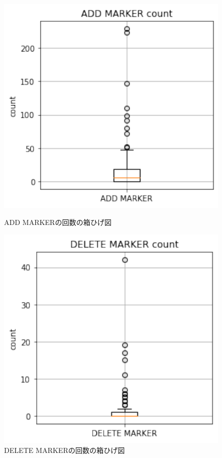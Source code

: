 \documentclass[a4paper,12pt]{ltjsreport}
\begin{document}
\begin{figure}[tbp]
  \begin{minipage}[b]{0.5\linewidth}
    \centering
    \includegraphics[scale=0.7]{add_marker.pdf}
    \caption{ADD MARKERの回数の箱ひげ図}
    \label{fig:add_marker}
  \end{minipage}
  \begin{minipage}[b]{0.5\linewidth}
    \centering
    \includegraphics[scale=0.7]{delete_marker.pdf}
    \caption{DELETE MARKERの回数の箱ひげ図}
    \label{fig:delete_marker}
  \end{minipage}
\end{figure}
\end{document}
